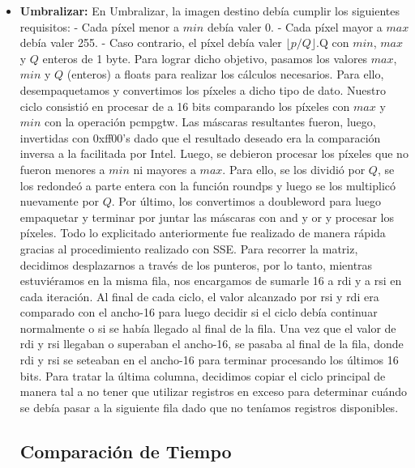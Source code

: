 \documentclass[10pt, a4paper]{article}
\begin{document}
\begin{itemize}
\item {\textbf{Umbralizar:}}
En Umbralizar, la imagen destino debía cumplir los siguientes requisitos:\newline
- Cada píxel menor a $min$ debía valer 0.\newline
- Cada píxel mayor a $max$ debía valer 255.\newline
- Caso contrario, el píxel debía valer $\lfloor p/Q \rfloor$.Q\newline
con $min$, $max$ y $Q$ enteros de 1 byte.\newline
\newline
Para lograr dicho objetivo, pasamos los valores $max$, $min$ y $Q$ (enteros) a floats para realizar los cálculos necesarios. Para ello, desempaquetamos y convertimos los píxeles a dicho tipo de dato.\newline
Nuestro ciclo consistió en procesar de a 16 bits comparando los píxeles con $max$ y $min$ con la operación pcmpgtw. Las máscaras resultantes fueron, luego, invertidas con 0xff00's dado que el resultado deseado era la comparación inversa a la facilitada por Intel. Luego, se debieron procesar los píxeles que no fueron menores a $min$ ni mayores a $max$. Para ello, se los dividió por $Q$, se los redondeó a parte entera con la función roundps y luego se los multiplicó nuevamente por $Q$. Por último, los convertimos a doubleword para luego empaquetar y terminar por juntar las máscaras con and y or y procesar los píxeles. Todo lo explicitado anteriormente fue realizado de manera rápida gracias al procedimiento realizado con SSE.\newline
Para recorrer la matriz, decidimos desplazarnos a través de los punteros, por lo tanto, mientras estuviéramos en la misma fila, nos encargamos de sumarle 16 a rdi y a rsi en cada iteración. Al final de cada ciclo, el valor alcanzado por rsi y rdi era comparado con el ancho-16 para luego decidir si el ciclo debía continuar normalmente o si se había llegado al final de la fila. Una vez que el valor de rdi y rsi llegaban o superaban el ancho-16, se pasaba al final de la fila, donde rdi y rsi se seteaban en el ancho-16 para terminar procesando los últimos 16 bits. Para tratar la última columna, decidimos copiar el ciclo principal de manera tal a no tener que utilizar registros en exceso para determinar cuándo se debía pasar a la siguiente fila dado que no teníamos registros disponibles.\newline
\subsection{Comparación de Tiempo}


\end{itemize}
\end{document}
